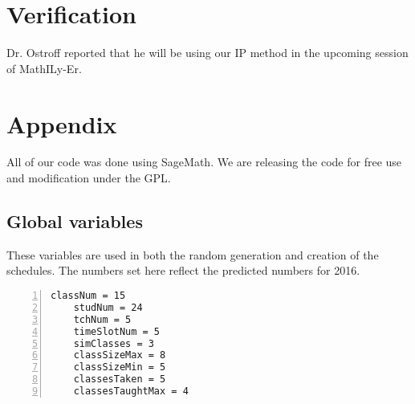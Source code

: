 \documentclass[11pt]{article}
\begin{document}
\section{Verification}
Dr. Ostroff reported that he will be using our IP method in the upcoming session of MathILy-Er.

\section{Appendix}
All of our code was done using SageMath. We are releasing the code for free use and modification under the GPL.

\subsection{Global variables}
These variables are used in both the random generation and creation of the schedules. The numbers set here reflect the predicted numbers for 2016.
\begin{lstlisting}[numbers=left,numberstyle=\tiny,numbersep=0pt]
    classNum = 15
    studNum = 24
    tchNum = 5
    timeSlotNum = 5
    simClasses = 3
    classSizeMax = 8
    classSizeMin = 5
    classesTaken = 5
    classesTaughtMax = 4
\end{lstlisting}
\end{document}
